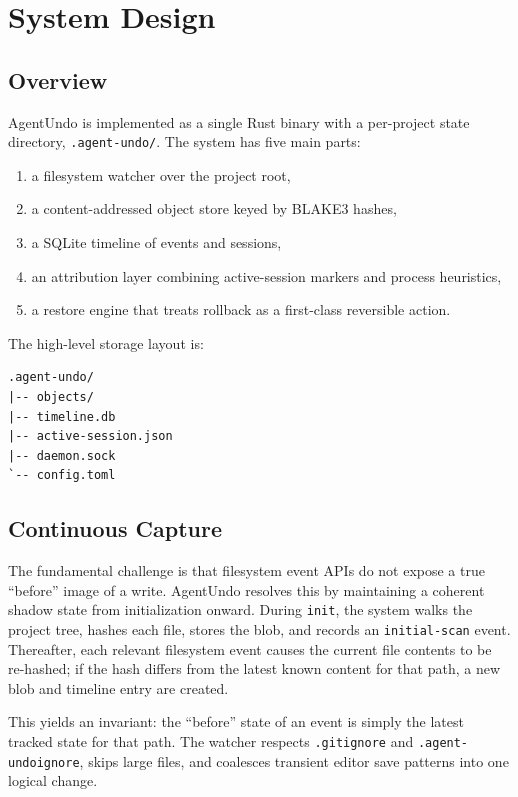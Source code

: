 \documentclass[10pt,a4paper]{article}
\begin{document}
\section{System Design}

\subsection{Overview}

AgentUndo is implemented as a single Rust binary with a per-project state
directory, \texttt{.agent-undo/}. The system has five main parts:

\begin{enumerate}
  \item a filesystem watcher over the project root,
  \item a content-addressed object store keyed by BLAKE3 hashes,
  \item a SQLite timeline of events and sessions,
  \item an attribution layer combining active-session markers and process heuristics,
  \item a restore engine that treats rollback as a first-class reversible action.
\end{enumerate}

The high-level storage layout is:

\begin{lstlisting}[style=code]
.agent-undo/
|-- objects/
|-- timeline.db
|-- active-session.json
|-- daemon.sock
`-- config.toml
\end{lstlisting}

\subsection{Continuous Capture}

The fundamental challenge is that filesystem event APIs do not expose a true
``before'' image of a write. AgentUndo resolves this by maintaining a coherent
shadow state from initialization onward. During \texttt{init}, the system walks
the project tree, hashes each file, stores the blob, and records an
\texttt{initial-scan} event. Thereafter, each relevant filesystem event causes
the current file contents to be re-hashed; if the hash differs from the latest
known content for that path, a new blob and timeline entry are created.

This yields an invariant: the ``before'' state of an event is simply the latest
tracked state for that path. The watcher respects \texttt{.gitignore} and
\texttt{.agent-undoignore}, skips large files, and coalesces transient editor
save patterns into one logical change.
\end{document}
